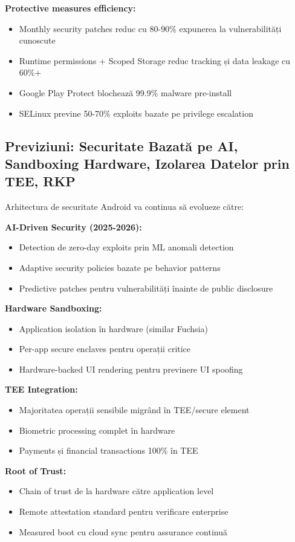 \documentclass[11pt,a4paper,twocolumn]{article}
\theoremstyle{definition}
\theoremstyle{plain}
\theoremstyle{remark}
\begin{document}
\textbf{Protective measures efficiency:}
\begin{itemize}
    \item Monthly security patches reduc cu 80-90\% expunerea la vulnerabilități cunoscute
    \item Runtime permissions + Scoped Storage reduc tracking și data leakage cu 60\%+
    \item Google Play Protect blochează 99.9\% malware pre-install
    \item SELinux previne 50-70\% exploits bazate pe privilege escalation
\end{itemize}

\subsection{Previziuni: Securitate Bazată pe AI, Sandboxing Hardware, Izolarea Datelor prin TEE, RKP}

Arhitectura de securitate Android va continua să evolueze către:

\textbf{AI-Driven Security (2025-2026):}
\begin{itemize}
    \item Detection de zero-day exploits prin ML anomali detection
    \item Adaptive security policies bazate pe behavior patterns
    \item Predictive patches pentru vulnerabilități înainte de public disclosure
\end{itemize}

\textbf{Hardware Sandboxing:}
\begin{itemize}
    \item Application isolation în hardware (similar Fuchsia)
    \item Per-app secure enclaves pentru operații critice
    \item Hardware-backed UI rendering pentru previnere UI spoofing
\end{itemize}

\textbf{TEE Integration:}
\begin{itemize}
    \item Majoritatea operații sensibile migrând în TEE/secure element
    \item Biometric processing complet în hardware
    \item Payments și financial transactions 100\% în TEE
\end{itemize}

\textbf{Root of Trust:}
\begin{itemize}
    \item Chain of trust de la hardware către application level
    \item Remote attestation standard pentru verificare enterprise
    \item Measured boot cu cloud sync pentru assurance continuă
\end{itemize}
\end{document}
